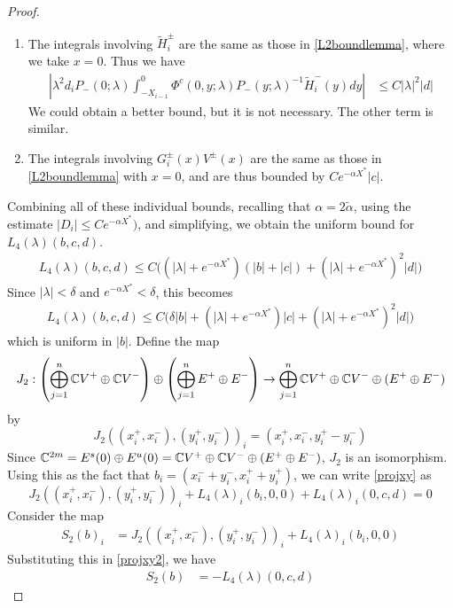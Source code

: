 \documentclass[thesis.tex]{subfiles}
\begin{document}
\begin{lemma}
\begin{proof}
\begin{enumerate}
\item The integrals involving $\tilde{H}_i^\pm$ are the same as those in \cref{L2boundlemma}, where we take $x = 0$. Thus we have
\begin{align*}
\left| \lambda^2 d_i P_-(0; \lambda) \int_{-X_{i-1}}^0 \Phi^c(0, y; \lambda) P_-(y; \lambda)^{-1} \tilde{H}_i^-(y) dy \right| &\leq C |\lambda|^2 |d| 
\end{align*}
We could obtain a better bound, but it is not necessary. The other term is similar.

\item The integrals involving $G_i^\pm(x) V^\pm(x)$ are the same as those in \cref{L2boundlemma} with $x = 0$, and are thus bounded by $C e^{-\alpha X^*} |c|$.
\end{enumerate}

Combining all of these individual bounds, recalling that $\alpha = 2 \tilde{\alpha}$, using the estimate $|D_i| \leq C e^{-\alpha X^*})$, and simplifying, we obtain the uniform bound for $L_4(\lambda)(b, c, d)$.
\begin{align*}
L_4(\lambda)(b, c, d) \leq 
C\Big( (|\lambda| + e^{-\alpha X^*})(|b| + |c|) + (|\lambda| + e^{-\alpha X^*})^2 |d|  \Big) 
\end{align*}
Since $|\lambda| < \delta$ and $e^{-\alpha X^*} < \delta$, this becomes
\begin{align*}
L_4(\lambda)(b, c, d) \leq 
C\Big( \delta |b| + (|\lambda| + e^{-\alpha X^*})|c| + (|\lambda| + e^{-\alpha X^*})^2 |d| \Big) 
\end{align*}
which is uniform in $|b|$. Define the map
\[
J_2: \left( \bigoplus_{j=1}^n \mathbb{C} V^+ \oplus \mathbb{C} V^- \right) \oplus
\left( \bigoplus_{j=1}^n E^+ \oplus E^- \right) 
\rightarrow \bigoplus_{j=1}^n \mathbb{C} V^+ \oplus \mathbb{C} V^- \oplus (E^+ \oplus E^-)
\]
by 
\[
J_2( (x_i^+, x_i^-),(y_i^+, y_i^-))_i = ( x_i^+, x_i^-, y_i^+ - y_i^- )
\]
Since $\mathbb{C}^{2m} = E^s(0) \oplus E^u(0) = \mathbb{C} V^+ \oplus \mathbb{C} V^- \oplus (E^+ \oplus E^-)$, $J_2$ is an isomorphism. Using this as the fact that $b_i = (x_i^- + y_i^-, x_i^+ + y_i^+)$, we can write \eqref{projxy} as
\begin{equation}\label{projxy2}
J_2( (x_i^+, x_i^-),(y_i^+, y_i^-))_i 
+ L_4(\lambda)_i(b_i, 0, 0) + L_4(\lambda)_i(0, c, d) = 0
\end{equation}
Consider the map
\begin{align*}
S_2(b)_i &= J_2( (x_i^+, x_i^-),(y_i^+, y_i^-))_i 
+ L_4(\lambda)_i(b_i, 0, 0) 
\end{align*}
Substituting this in \eqref{projxy2}, we have
\begin{align*}
S_2(b) &= -L_4(\lambda)(0, c, d)
\end{align*}


\end{proof}
\end{lemma}
\end{document}
